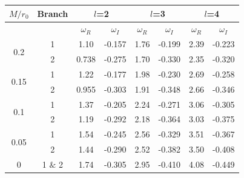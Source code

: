 \documentclass[a4paper,12pt]{article}
\begin{document}
\begin{table}
\centering
\begin{tabular}{|c|c|c|c|c|c|c|c|} 
\hline
\textbf{$M/r_0$}       &   Branch     & \multicolumn{2}{c|}{$l$=2}               & \multicolumn{2}{c|}{$l$=3}                       & \multicolumn{2}{c|}{$l$=4}                        \\ 
\hline
                      &        & \textbf{$\omega_R$}               & \textbf{$\omega_I$}                & \textbf{$\omega_R$}               & \textbf{$\omega_I$}                & \textbf{$\omega_R$}               & \textbf{$\omega_I$}                 \\ 
\hline
\multirow{2}{*}{0.2}  & 1 & 1.10                  & -0.157                  & 1.76                  & -0.199                  & 2.39                  & -0.223                   \\
                      & 2 & 0.738                  & -0.275                  & 1.70                  & -0.330                  & 2.35                  & -0.320                   \\
\hline
\multirow{2}{*}{0.15}  & 1 & 1.22                  & -0.177                  & 1.98                  & -0.230                  & 2.69                  & -0.258                   \\
                      & 2 & 0.955                 & -0.303                  & 1.91                  & -0.348                  & 2.66                  & -0.346                   \\
\hline
\multirow{2}{*}{0.1}  & 1 & 1.37                  & -0.205                  & 2.24                  & -0.271                  & 3.06                  & -0.305                   \\
                      & 2 & 1.19                  & -0.292                  & 2.18                  & -0.364                  & 3.03                  & -0.375                   \\
\hline                      
\multirow{2}{*}{0.05}  & 1 & 1.54                  & -0.245                  & 2.56                  & -0.329                  & 3.51                  & -0.367                   \\
                      &  2 & 1.44                  & -0.290                  & 2.52                  & -0.382                  & 3.50                  & -0.408                   \\
\hline                      
%
{0}    
& 1 $\&$ 2 & 
%
{1.74} & {-0.305} & {2.95} & {-0.410} & {4.08} & {-0.449}  \\

\end{tabular}
\end{table}
\end{document}
